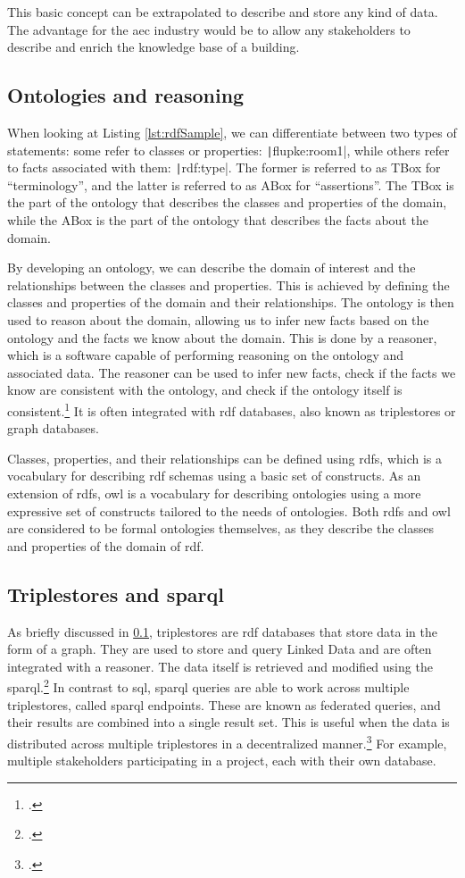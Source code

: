 This basic concept can be extrapolated to describe and store any kind of data. The advantage for the \ac{aec} industry would be to allow any stakeholders to describe and enrich the knowledge base of a building.

\subsection{Ontologies and reasoning}\label{subsec:ontologies}
When looking at Listing \ref{lst:rdfSample}, we can differentiate between two types of statements: some refer to classes or properties: \texttt|flupke:room1|, while others refer to facts associated with them: \texttt|rdf:type|. The former is referred to as TBox for \enquote{terminology}, and the latter is referred to as ABox for \enquote{assertions}. The TBox is the part of the ontology that describes the classes and properties of the domain, while the ABox is the part of the ontology that describes the facts about the domain.

By developing an ontology, we can describe the domain of interest and the relationships between the classes and properties. This is achieved by defining the classes and properties of the domain and their relationships. The ontology is then used to reason about the domain, allowing us to infer new facts based on the ontology and the facts we know about the domain. This is done by a reasoner, which is a software capable of performing reasoning on the ontology and associated data. The reasoner can be used to infer new facts, check if the facts we know are consistent with the ontology, and check if the ontology itself is consistent.\footcite{w3cInfering} It is often integrated with \ac{rdf} databases, also known as triplestores or graph databases.

Classes, properties, and their relationships can be defined using \ac{rdfs}, which is a vocabulary for describing \ac{rdf} schemas using a basic set of constructs. As an extension of \ac{rdfs}, \ac{owl} is a vocabulary for describing ontologies using a more expressive set of constructs tailored to the needs of ontologies. Both \ac{rdfs} and \ac{owl} are considered to be formal ontologies themselves, as they describe the classes and properties of the domain of \ac{rdf}.

\subsection{Triplestores and \acs{sparql}}
As briefly discussed in \ref{subsec:ontologies}, triplestores are \ac{rdf} databases that store data in the form of a graph. They are used to store and query Linked Data and are often integrated with a reasoner. The data itself is retrieved and modified using the \ac{sparql}.\footcite{w3cQuery} In contrast to \ac{sql}, \ac{sparql} queries are able to work across multiple triplestores, called \ac{sparql} endpoints. These are known as federated queries, and their results are combined into a single result set. This is useful when the data is distributed across multiple triplestores in a decentralized manner.\footcite{ontotextSpaql} For example, multiple stakeholders participating in a project, each with their own database.

